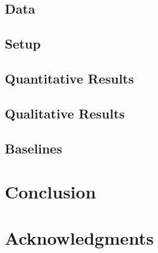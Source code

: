 \documentclass[11pt]{article}
\begin{document}
\subsection{Data}
\label{sec:Data}





\subsection{Setup}
\label{sec:setup}







\subsection{Quantitative Results}
\label{sec:Quantitative}


\subsection{Qualitative Results}
\label{sec:Qualitative}




\subsection{Baselines}












\section{Conclusion}
\label{sec:conclusion}







\clearpage
\section*{Acknowledgments}


\clearpage
\end{document}
